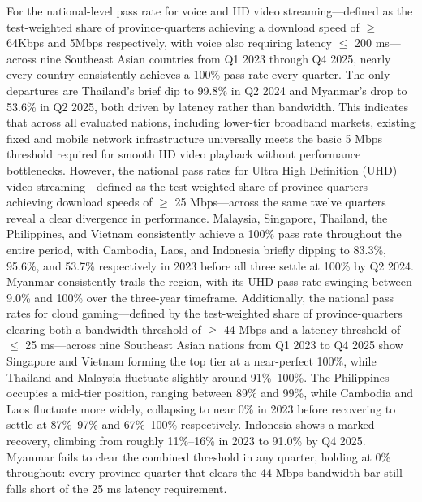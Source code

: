 \documentclass[sigconf,nonacm]{acmart}
\begin{document}
For the national-level pass rate for voice and HD video
streaming---defined as the test-weighted share of province-quarters
achieving a download speed of $\geq$ 64Kbps and 5Mbps respectively, with
voice also requiring latency $\leq$ 200 ms---across nine Southeast Asian
countries from Q1 2023 through Q4 2025, nearly every country consistently
achieves a 100\% pass rate every quarter. The only departures are
Thailand's brief dip to 99.8\% in Q2 2024 and Myanmar's drop to 53.6\% in
Q2 2025, both driven by latency rather than bandwidth. This indicates that
across all evaluated nations, including lower-tier broadband markets,
existing fixed and mobile network infrastructure universally meets the
basic 5 Mbps threshold required for smooth HD video playback without
performance bottlenecks. However, the national pass rates for Ultra High
Definition (UHD) video streaming---defined as the test-weighted share of
province-quarters achieving download speeds of $\geq$ 25 Mbps---across the
same twelve quarters reveal a clear divergence in performance. Malaysia,
Singapore, Thailand, the Philippines, and Vietnam consistently achieve a
100\% pass rate throughout the entire period, with Cambodia, Laos, and
Indonesia briefly dipping to 83.3\%, 95.6\%, and 53.7\% respectively in
2023 before all three settle at 100\% by Q2 2024. Myanmar consistently trails the
region, with its UHD pass rate swinging between 9.0\% and 100\% over the
three-year timeframe. Additionally, the national pass rates for cloud
gaming---defined by the test-weighted share of province-quarters clearing
both a bandwidth threshold of $\geq$ 44 Mbps and a latency threshold of
$\leq$ 25 ms---across nine Southeast Asian nations from Q1 2023 to Q4 2025
show Singapore and Vietnam forming the top tier at a near-perfect 100\%,
while Thailand and Malaysia fluctuate slightly around 91\%--100\%. The
Philippines occupies a mid-tier position, ranging between 89\% and 99\%,
while Cambodia and Laos fluctuate more widely, collapsing to near 0\% in
2023 before recovering to settle at 87\%--97\% and 67\%--100\%
respectively. Indonesia shows a marked recovery, climbing from roughly
11\%--16\% in 2023 to 91.0\% by Q4 2025.
Myanmar fails to clear the combined threshold in any quarter, holding at
0\% throughout: every province-quarter that clears the 44 Mbps bandwidth
bar still falls short of the 25 ms
latency requirement.
\end{document}
